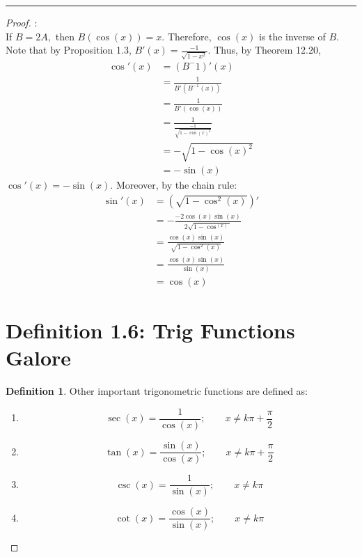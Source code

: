 \documentclass[openany, amssymb, psamsfonts]{amsart}
\theoremstyle{definition}
\newtheorem{defn}{Definition}[section]
\numberwithin{equation}{section}
\begin{document}
\vspace{4pt}     \hrule   \vspace{4pt}\begin{proof}:\\
If $B = 2A,$ then $B(\cos(x)) = x.$ Therefore, $\cos(x)$ is the inverse of $B.$ Note that by Proposition 1.3, $B'(x) = \frac{-1}{\sqrt{1-x^2}}.$ Thus, by Theorem 12.20, 
\begin{align*}
\cos'(x) &= (B^-1)'(x)\\
&= \frac{1}{B'(B^{-1}(x))}\\
&= \frac{1}{B'(\cos(x))}\\
&= \frac{1}{\frac{-1}{\sqrt{1-\cos(x)^2}}}\\
&= -\sqrt{1-\cos(x)^2}\\
&= -\sin(x)
\end{align*}
$\cos'(x) = -\sin(x).$
Moreover, by the chain rule:
\begin{align*}
\sin'(x) &= (\sqrt{1 - \cos^2(x)})'\\
&= -\frac{-2\cos(x)\sin(x)}{2\sqrt{1 - \cos^(x)}}\\
&= \frac{\cos(x)\sin(x)}{\sqrt{1 - \cos^2(x)}}\\
&= \frac{\cos(x)\sin(x)}{\sin(x)}\\
&= \cos(x)
\end{align*}

\section*{Definition 1.6: Trig Functions Galore}
\begin{defn}
Other important trigonometric functions are defined as:
\begin{enumerate}
\item \[\sec(x) = \frac{1}{\cos(x)};\qquad x\neq k\pi + \frac{\pi}{2}\]
\item \[\tan(x) = \frac{\sin(x)}{\cos(x)};\qquad x\neq k\pi + \frac{\pi}{2}\]
\item \[\csc(x) = \frac{1}{\sin(x)};\qquad x\neq k\pi \]
\item \[\cot(x) = \frac{\cos(x)}{\sin(x)};\qquad x\neq k\pi \]
\end{enumerate}
\end{defn}


\end{proof}
\end{document}
